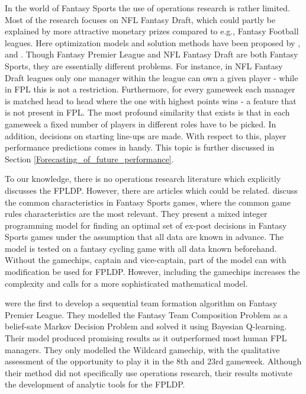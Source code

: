 \newpar

In the world of Fantasy Sports the use of operations research is rather limited. Most of the research focuses on NFL Fantasy Draft, which could partly be explained by more attractive monetary prizes compared to e.g., Fantasy Football leagues. Here optimization models and solution methods have been proposed by \cite{Fry}, \cite{Gibson} and \cite{Becker}. Though Fantasy Premier League and NFL Fantasy Draft are both Fantasy Sports, they are essentially different problems. For instance, in NFL Fantasy Draft leagues only one manager within the league can own a given player - while in FPL this is not a restriction. Furthermore, for every gameweek each manager is matched head to head where the one with highest points wins - a feature that is not present in FPL. The most profound similarity that exists is that in each gameweek a fixed number of players in different roles have to be picked. In addition, decisions on starting line-ups are made. With respect to this, player performance predictions comes in handy. This topic is further discussed in Section \ref{Forecasting_of_future_performance}.


\newpar

To our knowledge, there is no operations research literature which explicitly discusses the FPLDP. However, there are articles which could be related. \cite{Mathsports} discuss the common characteristics in Fantasy Sports games, where the common game rules characteristics are the most relevant. They present a mixed integer programming model for finding an optimal set of ex-post decisions in Fantasy Sports games under the assumption that all data are known in advance. The model is tested on a fantasy cycling game with all data known beforehand. Without the gamechips, captain and vice-captain, part of the model can with modification be used for FPLDP. However, including the gamechips increases the complexity and calls for a more sophisticated mathematical model. 

\newpar

\cite{Matthews} were the first to develop a sequential team formation algorithm on Fantasy Premier League. They modelled the Fantasy Team Composition Problem as a belief-sate Markov Decision Problem and solved it using Bayesian Q-learning. Their model produced promising results as it outperformed most human FPL managers. They only modelled the Wildcard gamechip, with the qualitative assessment of the opportunity to play it in the 8th and 23rd gameweek. Although their method did not specifically use operations research, their results motivate the development of analytic tools for the FPLDP. 

